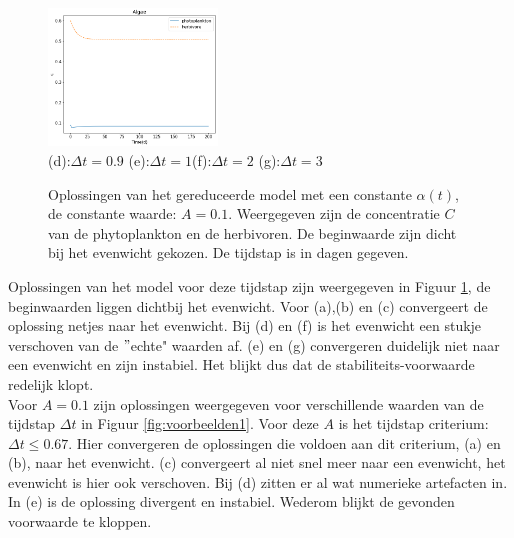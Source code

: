 \begin{figure}[H]
{  \hfill
  \includegraphics[width=0.4\textwidth]{figures/appendixstab/dt2.png}
    }
  \\
  (d):$\Delta t=0.9$ \hspace{0.28\textwidth} (e):$\Delta t=1$\hspace{0.28\textwidth}(f):$\Delta t=2$
  \centering
  (g):$\Delta t=3$
  \caption{Oplossingen van het gereduceerde model met een constante $\alpha(t)$, de constante waarde: $A=0.1$. Weergegeven zijn de concentratie $C$ van de phytoplankton en de herbivoren. De beginwaarde zijn dicht bij het evenwicht gekozen. De tijdstap is in dagen gegeven.}
  \label{fig:voorbeelden}
\end{figure} 
Oplossingen van het model voor deze tijdstap zijn weergegeven in Figuur \ref{fig:voorbeelden}, de beginwaarden liggen dichtbij het evenwicht. Voor (a),(b) en (c) convergeert de oplossing netjes naar het evenwicht. Bij (d) en (f) is het evenwicht een stukje verschoven van de $"$echte" waarden af. (e) en (g) convergeren duidelijk niet naar een evenwicht en zijn instabiel. Het blijkt dus dat de stabiliteits-voorwaarde redelijk klopt.\\
Voor $A=0.1$ zijn oplossingen weergegeven voor verschillende waarden van de tijdstap $\Delta t$ in Figuur \ref{fig:voorbeelden1}. Voor deze $A$ is het tijdstap criterium: $\Delta t \leq 0.67$. Hier convergeren de oplossingen die voldoen aan dit criterium, (a) en (b), naar het evenwicht. (c) convergeert al niet snel meer naar een evenwicht, het evenwicht is hier ook verschoven. Bij (d) zitten er al wat numerieke artefacten in. In (e) is de oplossing divergent en instabiel. Wederom blijkt de gevonden voorwaarde te kloppen.
